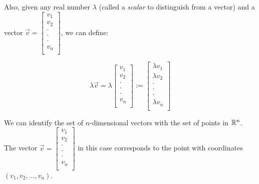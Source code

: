\documentclass[10pt]{amsart}
\begin{document}
Also, given any real number $\lambda$ (called a {\em scalar} to
distinguish from a vector) and a vector $\vec{v} = \left[\begin{matrix} v_1 \\ v_2 \\ \cdot \\ \cdot \\ \cdot \\ v_n \\\end{matrix}\right]$, we can define:

$$\lambda \vec{v} = \lambda\left[\begin{matrix} v_1 \\ v_2 \\ \cdot \\ \cdot \\ \cdot \\ v_n \\\end{matrix}\right] := \left[\begin{matrix} \lambda v_1 \\ \lambda v_2 \\ \cdot \\ \cdot \\ \cdot \\ \lambda v_n \\\end{matrix}\right]$$

We can identify the set of $n$-dimensional vectors with the set of
points in $\mathbb{R}^n$. The vector $\vec{v} = \left[\begin{matrix}
    v_1 \\ v_2 \\ \cdot \\ \cdot \\ \cdot \\ v_n
    \\\end{matrix}\right]$ in this case corresponds to the point with
coordinates $(v_1,v_2,\dots,v_n)$.
\end{document}
